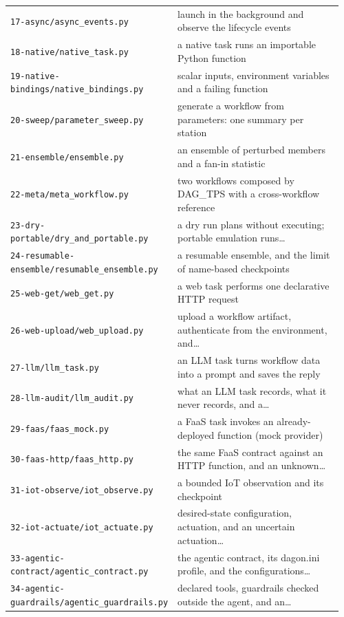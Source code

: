 {\begin{longtable}{@{}p{0.43\linewidth}p{0.53\linewidth}@{}}
\texttt{17-async/async\_events.py} & launch in the background and observe the lifecycle events \\
\texttt{18-native/native\_task.py} & a native task runs an importable Python function \\
\texttt{19-native-bindings/native\_bindings.py} & scalar inputs, environment variables and a failing function \\
\texttt{20-sweep/parameter\_sweep.py} & generate a workflow from parameters: one summary per station \\
\texttt{21-ensemble/ensemble.py} & an ensemble of perturbed members and a fan-in statistic \\
\texttt{22-meta/meta\_workflow.py} & two workflows composed by DAG\_TPS with a cross-workflow reference \\
\texttt{23-dry-portable/dry\_and\_portable.py} & a dry run plans without executing; portable emulation runs\ldots \\
\texttt{24-resumable-ensemble/resumable\_ensemble.py} & a resumable ensemble, and the limit of name-based checkpoints \\
\texttt{25-web-get/web\_get.py} & a web task performs one declarative HTTP request \\
\texttt{26-web-upload/web\_upload.py} & upload a workflow artifact, authenticate from the environment, and\ldots \\
\texttt{27-llm/llm\_task.py} & an LLM task turns workflow data into a prompt and saves the reply \\
\texttt{28-llm-audit/llm\_audit.py} & what an LLM task records, what it never records, and a\ldots \\
\texttt{29-faas/faas\_mock.py} & a FaaS task invokes an already-deployed function (mock provider) \\
\texttt{30-faas-http/faas\_http.py} & the same FaaS contract against an HTTP function, and an unknown\ldots \\
\texttt{31-iot-observe/iot\_observe.py} & a bounded IoT observation and its checkpoint \\
\texttt{32-iot-actuate/iot\_actuate.py} & desired-state configuration, actuation, and an uncertain actuation\ldots \\
\texttt{33-agentic-contract/agentic\_contract.py} & the agentic contract, its dagon.ini profile, and the configurations\ldots \\
\texttt{34-agentic-guardrails/agentic\_guardrails.py} & declared tools, guardrails checked outside the agent, and an\ldots \\

\end{longtable}}
